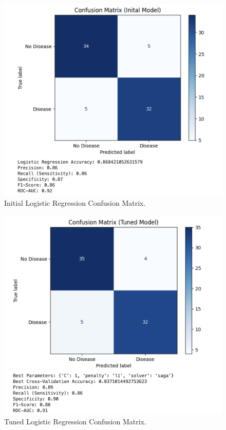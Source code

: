\begin{figure}[htbp]
    \centerline{\includegraphics[scale=0.2]{img/confusion_matrix_inital.png}}
    \caption{Initial Logistic Regression Confusion Matrix.}\label{Initial Logistic Regression Confusion Matrix}
\end{figure}

\begin{figure}[htbp]
    \centerline{\includegraphics[scale=0.2]{img/confusion_matrix_tuned_model.png}}
    \caption{Tuned Logistic Regression Confusion Matrix.}\label{Tuned Logistic Regression Confusion Matrix}
\end{figure}

